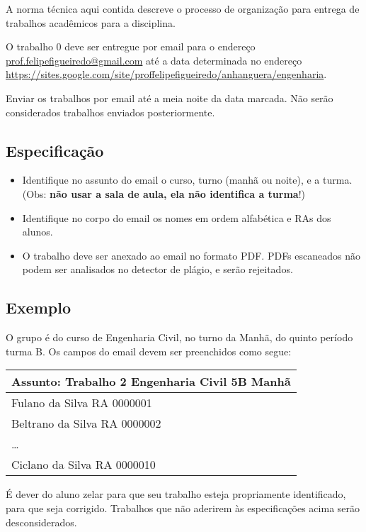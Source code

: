 \documentclass[a4paper]{article}
\begin{document}
A norma técnica aqui contida descreve o processo de organização para
entrega de trabalhos acadêmicos para a disciplina.

O trabalho 0 deve ser entregue por email para o endereço
\url{prof.felipefigueiredo@gmail.com} até a data determinada no
endereço
\url{https://sites.google.com/site/proffelipefigueiredo/anhanguera/engenharia}.
 
Enviar os trabalhos por email até a meia noite da data marcada. Não
serão considerados trabalhos enviados posteriormente.

\subsection{Especificação}

\begin{itemize}
\item Identifique no assunto do email o curso, turno (manhã ou noite),
  e a turma. (Obs: {\bf não usar a sala de aula, ela não identifica a turma}!)
\item Identifique no corpo do email os nomes em ordem alfabética e RAs
  dos alunos.
\item O trabalho deve ser anexado ao email no formato PDF. PDFs
  escaneados não podem ser analisados no detector de plágio, e serão
  rejeitados.
\end{itemize}

\subsection{Exemplo}

O grupo é do curso de Engenharia Civil, no turno da Manhã, do quinto
período turma B. Os campos do email devem ser preenchidos como segue:

\begin{tabular}{|l|}
  \hline
  Assunto: Trabalho 2 Engenharia Civil 5B Manhã\\
  \hline
  Fulano da Silva RA 0000001 \\
  Beltrano da Silva RA 0000002 \\
  \ldots \\
  Ciclano da Silva RA 0000010  \\
  \hline
\end{tabular}
 
É dever do aluno zelar para que seu trabalho esteja propriamente
identificado, para que seja corrigido. Trabalhos que não aderirem às
especificações acima serão desconsiderados.
 
\end{document}
